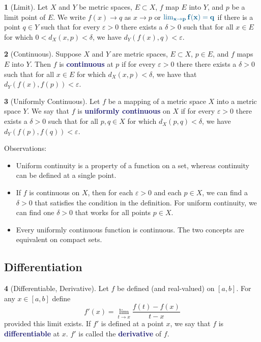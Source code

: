\documentclass[11pt]{article}
\numberwithin{equation}{section}
\newcommand{\navy}[1]{\textcolor{MidnightBlue}{\bf #1}}
\theoremstyle{plain}
\theoremstyle{definition}
\newtheorem{definition}{\color{MidnightBlue}{\textbf{Definition}}}[section]
\newcommand{\1}{\mathbbm 1}
\def\d{\delta}
\newcommand{\e}{\varepsilon}
\begin{document}
\begin{definition}[Limit]
	Let $X$ and $Y$ be metric spaces, $E \subset X$, $f$ map $E$ into $Y$, and $p$ be a limit point of $E$. We write $f(x) \to q$ as $x \to p$ or $\navy{\lim_{x\to p} f(x) = q}$ if there is a point $q \in Y$ such that for every $\e > 0$ there exists a $\d > 0$ such that for all $x \in E$ for which $0 < d_X(x,p) < \d$, we have $d_Y(f(x),q) < \e$. 
\end{definition}

\begin{definition}[Continuous]
	Suppose $X$ and $Y$ are metric spaces, $E \subset X$, $p \in E$, and $f$ maps $E$ into $Y$. Then $f$ is \navy{continuous} at $p$ if for every $\e > 0$ there there exists a $\d > 0$ such that for all $x \in E$ for which $d_X(x,p) < \d$, we have that $d_Y(f(x), f(p)) < \e$. 
\end{definition}

\begin{definition}[Uniformly Continuous]
	Let $f$ be a mapping of a metric space $X$ into a metric space $Y$. We say that $f$ is \navy{uniformly continuous} on $X$ if for every $\e > 0$ there exists a $\d > 0$ such that for all $p,q \in X$ for which $d_X(p,q) < \delta$, we have $d_Y(f(p),f(q)) < \e$. 
\end{definition}

Observations:
\begin{itemize}
	\item Uniform continuity is a property of a function on a set, whereas continuity can be defined at a single point. 
	\item If $f$ is continuous on $X$, then for each $\e > 0$ and each $p \in X$, we can find a $\d > 0$ that satisfies the condition in the definition. For uniform continuity, we can find one $\d > 0$ that works for all points $p \in X$. 
	\item Every uniformly continuous function is continuous. The two concepts are equivalent on compact sets. 
\end{itemize}

\subsection{Differentiation}

\begin{definition}[Differentiable, Derivative]
	Let $f$ be defined (and real-valued) on $[a,b]$. For any $x \in [a,b]$ define
	\begin{equation}
		f'(x) = \lim_{t \to x} \frac{f(t) - f(x)}{t - x}
	\end{equation}
	provided this limit exists. If $f'$ is defined at a point $x$, we say that $f$ is \navy{differentiable} at $x$. $f'$ is called the \navy{derivative} of $f$.  
\end{definition}
\end{document}
